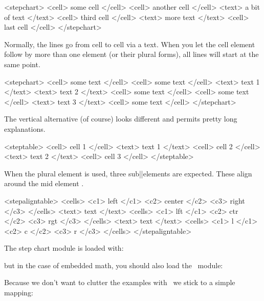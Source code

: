 \startbuffer
<stepchart>
  <cell> some cell </cell>
  <cell> another cell </cell> <text> a bit of text </text>
  <cell> third cell </cell> <text> more text </text>
  <cell> last cell </cell>
</stepchart>
\stopbuffer

\typebuffer \processxmlbuffer

Normally, the lines go from cell to cell via a text. When you let the \type
{cell} element follow by more than one  element (or their plural
forms), all lines will start at the same point.

\startbuffer
<stepchart>
  <cell> some text </cell>
  <cell> some text </cell> <text> text 1 </text> <text> text 2 </text>
  <cell> some text </cell>
  <cell> some text </cell> <text> text 3 </text>
  <cell> some text </cell>
</stepchart>
\stopbuffer

\typebuffer \processxmlbuffer

The vertical alternative (of course) looks different and permits pretty long
explanations.

\startbuffer
<steptable>
  <cell> cell 1 </cell>
  <text> text 1 </text>
  <cell> cell 2 </cell>
  <text> text 2 </text>
  <cell> cell 3 </cell>
</steptable>
\stopbuffer

\typebuffer \processxmlbuffer

When the plural element  is used, three sub||elements are expected.
These align around the mid element .

\startbuffer
<stepaligntable>
  <cells> <c1> left </c1> <c2> center </c2> <c3> right </c3> </cells>
  <text> text </text>
  <cells> <c1> lft </c1> <c2> ctr </c2> <c3> rgt </c3> </cells>
  <text> text </text>
  <cells> <c1> l </c1> <c2> c </c2> <c3> r </c3> </cells>
</stepaligntable>
\stopbuffer

\typebuffer \processxmlbuffer

\stopsection

\startsection[title=Usage]

The step chart module is loaded with:

\starttyping
\usemodule[cell] %
\stoptyping

\noindentation but in the case of embedded math, you should also load the \MATHML\ module:

\starttyping
{}
\stoptyping

\stopsection

\startsection[title=\XML\ example]

Because we don't want to clutter the examples with \MATHML\ we stick to a simple
mapping:


